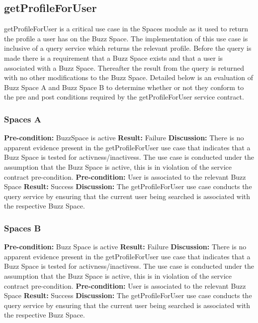 
\newpage
\subsection{getProfileForUser}

getProfileForUser is a critical use case in the Spaces module as it used to return the profile a user has on the Buzz Space.
The implementation of this use case is inclusive of a query service which returns the relevant profile.
Before the query is made there is a requirement that a Buzz Space exists and that a user is associated with a Buzz Space.
Thereafter the result from the query is returned with no other modifications to the Buzz Space.
Detailed below is an evaluation of Buzz Space A and Buzz Space B to determine whether or not they conform to the pre and post conditions required by the getProfileForUser service contract. 

\subsubsection{Spaces A}
\textbf{Pre-condition:}  BuzzSpace is active \newline
\textbf{Result:}  Failure \newline
\textbf{Discussion:}  There is no apparent evidence present in the getProfileForUser use case that indicates that a Buzz Space is tested for activness/inactivess.
The use case is conducted under the assumption that the Buzz Space is active, this is in violation of the service contract pre-condition. \newline \newline
\textbf{Pre-condition:}  User is associated to the relevant Buzz Space\newline
\textbf{Result:}  Success \newline
\textbf{Discussion:}  The getProfileForUser use case conducts the query service by ensuring that the current user being searched is associated with the respective Buzz Space.
\subsubsection{Spaces B}
\textbf{Pre-condition:}  Buzz Space is active \newline
\textbf{Result:}  Failure \newline
\textbf{Discussion:}  There is no apparent evidence present in the getProfileForUser use case that indicates that a Buzz Space is tested for activness/inactivess.
The use case is conducted under the assumption that the Buzz Space is active, this is in violation of the service contract pre-condition. \newline \newline
\textbf{Pre-condition:}  User is associated to the relevant Buzz Space\newline
\textbf{Result:}  Success \newline
\textbf{Discussion:}  The getProfileForUser use case conducts the query service by ensuring that the current user being searched is associated with the respective Buzz Space.

